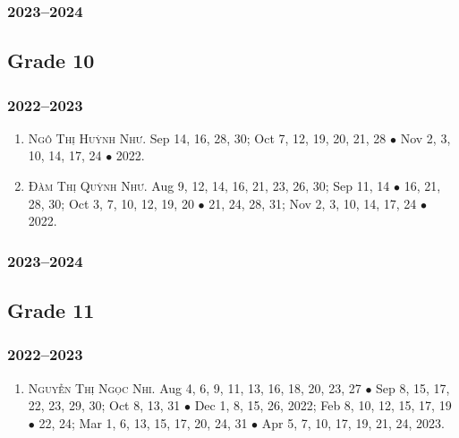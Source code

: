 \documentclass{article}
\begin{document}
\subsubsection{2023--2024}


\subsection{Grade 10}

\subsubsection{2022--2023}

\begin{enumerate}
	\item \textsc{Ngô Thị Huỳnh Như.} {\sf[In]} Sep 14, 16, 28, 30; Oct 7, 12, 19, 20, 21, 28 $\bullet$ Nov 2, 3, 10, 14, 17, 24 $\bullet$ 2022. {\sf[Out]}
	\item \textsc{Đàm Thị Quỳnh Như.} {\sf[In]} Aug 9, 12, 14, 16, 21, 23, 26, 30; Sep 11, 14 $\bullet$ 16, 21, 28, 30; Oct 3, 7, 10, 12, 19, 20 $\bullet$ 21, 24, 28, 31; Nov 2, 3, 10, 14, 17, 24 $\bullet$ 2022. {\sf[Out]}
\end{enumerate}

\subsubsection{2023--2024}


\subsection{Grade 11}

\subsubsection{2022--2023}

\begin{enumerate}
	\item \textsc{Nguyễn Thị Ngọc Nhi.} {\sf[In]} Aug 4, 6, 9, 11, 13, 16, 18, 20, 23, 27 $\bullet$ Sep 8, 15, 17, 22, 23, 29, 30; Oct 8, 13, 31 $\bullet$ Dec 1, 8,  15, 26, 2022; Feb 8, 10, 12, 15, 17, 19 $\bullet$ 22, 24; Mar 1, 6, 13, 15, 17, 20, 24, 31 $\bullet$ Apr 5, 7, 10, 17, 19, 21, 24, 2023.
\end{enumerate}
\end{document}
